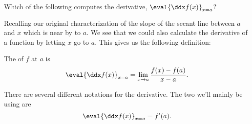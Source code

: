 \documentclass{ximera}
\begin{document}
\begin{question} 
    Which of the following computes the derivative, $\eval{\ddx f(x)}_{x=a}$?
    \begin{selectAll}
    \end{selectAll}
\end{question}

Recalling our original characterization of the slope of the secant line
between $a$ and $x$ which is near by to $a$.  We see that we could also
calculate the derivative of a function by letting $x$ go to $a$.  This 
gives us the following definition:

\begin{definition}
	The  of $f$ at $a$ is
	\[
	\eval{\ddx f(x)}_{x=a} = \lim_{x\to a} \frac{f(x) - f(a)}{x-a}.
	\]
\end{definition}


\begin{definition}
  There are several different notations for the derivative.  The two we'll mainly be using are
  \[
  \eval{\ddx f(x)}_{x=a} = f'(a).
  \]
\end{definition}
\end{document}
